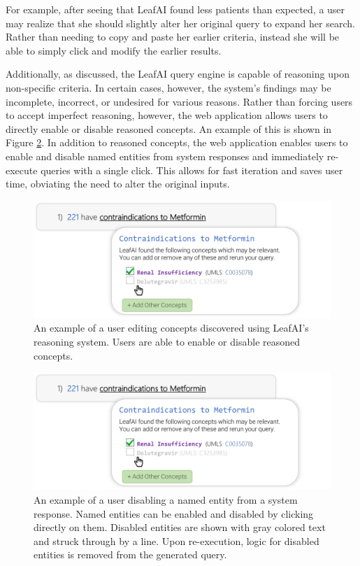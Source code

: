 \documentclass[../main.tex]{subfiles}
\begin{document}
For example, after seeing that LeafAI found less patients than expected, a user may realize that she should slightly alter her original query to expand her search. Rather than needing to copy and paste her earlier criteria, instead she will be able to simply click and modify the earlier results.

Additionally, as discussed, the LeafAI query engine is capable of reasoning upon non-specific criteria. In certain cases, however, the system's findings may be incomplete, incorrect, or undesired for various reasons. Rather than forcing users to accept imperfect reasoning, however, the web application allows users to directly enable or disable reasoned concepts. An example of this is shown in Figure \ref{fig_leafai_edit}. In addition to reasoned concepts, the web application enables users to enable and disable named entities from system responses and immediately re-execute queries with a single click. This allows for fast iteration and saves user time, obviating the need to alter the original inputs.

\begin{figure}[h!]
  \centering
  \includegraphics[scale=0.68]{Figures/8_web_application/leafai_edit.pdf}  
  \caption{An example of a user editing concepts discovered using LeafAI's reasoning system. Users are able to enable or disable reasoned concepts.}
\label{fig_leafai_edit}
\end{figure}

\begin{figure}[h!]
  \centering
  \includegraphics[scale=0.68]{Figures/8_web_application/leafai_edit.pdf}  
  \caption{An example of a user disabling a named entity from a system response. Named entities can be enabled and disabled by clicking directly on them. Disabled entities are shown with gray colored text and struck through by a line. Upon re-execution, logic for disabled entities is removed from the generated query.}
\label{fig_leafai_edit}
\end{figure}
\end{document}
